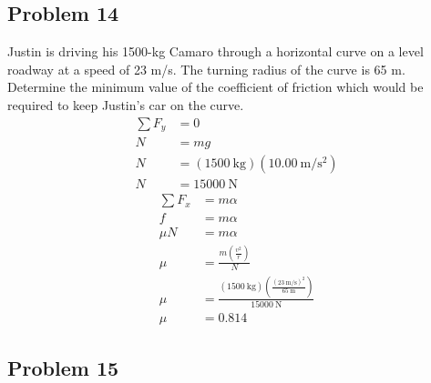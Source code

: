 \documentclass{article}
\begin{document}
\subsection{Problem 14}

Justin is driving his 1500-kg Camaro through a horizontal curve on a level roadway at a speed of 23 m/s. The turning radius of the curve is 65 m. Determine the minimum value of the coefficient of friction which would be required to keep Justin's car on the curve.
\begin{align*}
	\sum F_y & = 0 \\
	N & = mg \\
	N & = (\SI{1500}{\kilogram})(\SI{10.00}{\meter \per \second \squared}) \\
	N & = \SI{15000}{\newton}
\end{align*}
\begin{align*}
	\sum F_x & = m\alpha \\
	f & = m\alpha \\
	\mu N & = m\alpha \\
	\mu & = \frac{ m \left( \frac{ v^2 }{ r } \right) }{ N } \\
	\mu & = \frac{ (\SI{1500}{\kilogram}) \left( \frac{ (\SI{23}{\meter \per \second})^2 }{ \SI{65}{\meter} } \right) }{ \SI{15000}{\newton} } \\
	\mu & = 0.814
\end{align*}

\subsection{Problem 15}
\end{document}

